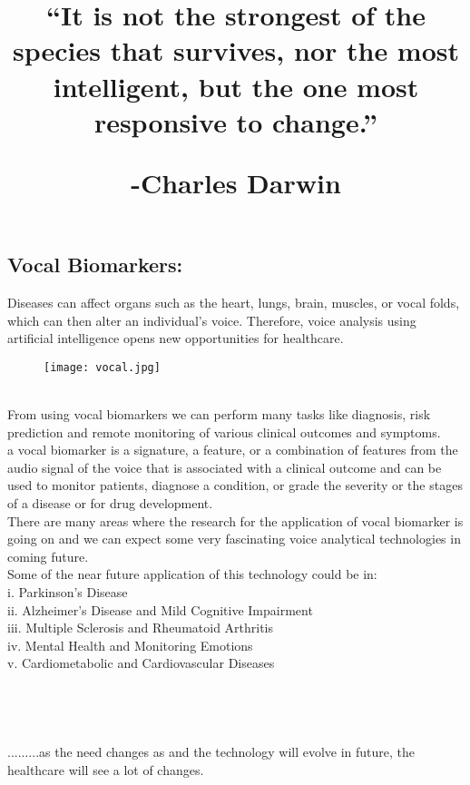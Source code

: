 \documentclass[a4paper,12pt]{article}
\begin{document}
\subsection{Vocal Biomarkers:}
Diseases can affect organs such as the heart, lungs, brain, muscles, or vocal folds, which can then alter an individual’s voice. Therefore, voice analysis using artificial intelligence opens new opportunities for healthcare.
\begin{figure}[h]       
	\texttt{[image: vocal.jpg]}
\end{figure} 
\\
 From using vocal biomarkers we can perform many tasks like diagnosis, risk prediction and remote monitoring of various clinical outcomes and symptoms.
 \\
 a vocal biomarker is a signature, a feature, or a combination of features from the audio signal of the voice that is associated with a clinical outcome and can be used to monitor patients, diagnose a condition, or grade the severity or the stages of a disease or for drug development.
 \\
 There are many areas where the research for the application of vocal biomarker is going on and we can expect some very fascinating voice analytical  technologies in coming future.
 \\
 Some of the near future application of this technology could be in:
 \\
 i. Parkinson’s Disease
 \\
 ii. Alzheimer’s Disease and Mild Cognitive Impairment
 \\
 iii. Multiple Sclerosis and Rheumatoid Arthritis
 \\
 iv. Mental Health and Monitoring Emotions
 \\
 v. Cardiometabolic and Cardiovascular Diseases
\\
\newline
\\
\\
\\
\\
.........as the need changes as and the technology will evolve in future, the healthcare will see a lot of changes.  
\\

{\huge \title{“It is not the strongest of the species that survives, nor the most intelligent, but the one most responsive to change.”
 \begin{flushright}-Charles Darwin \end{flushright}   }}
\end{document}
